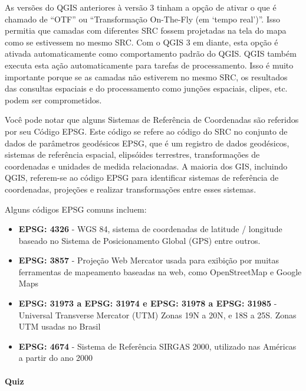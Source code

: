 \documentclass[
]{book}
\providecommand{\tightlist}{%
  \setlength{\itemsep}{0pt}\setlength{\parskip}{0pt}}
\theoremstyle{definition}
\theoremstyle{definition}
\theoremstyle{definition}
\theoremstyle{definition}
\theoremstyle{remark}
\begin{document}
As versões do QGIS anteriores à versão 3 tinham a opção de ativar o que é chamado de ``OTF'' ou ``Transformação On-The-Fly (em `tempo real')''. Isso permitia que camadas com diferentes SRC fossem projetadas na tela do mapa como se estivessem no mesmo SRC. Com o QGIS 3 em diante, esta opção é ativada automaticamente como comportamento padrão do QGIS. QGIS também executa esta ação automaticamente para tarefas de processamento. Isso é muito importante porque se as camadas não estiverem no mesmo SRC, os resultados das consultas espaciais e do processamento como junções espaciais, clipes, etc. podem ser comprometidos.

Você pode notar que alguns Sistemas de Referência de Coordenadas são referidos por seu Código EPSG. Este código se refere ao código do SRC no conjunto de dados de parâmetros geodésicos EPSG, que é um registro de dados geodésicos, sistemas de referência espacial, elipsóides terrestres, transformações de coordenadas e unidades de medida relacionadas. A maioria dos GIS, incluindo QGIS, referem-se ao código EPSG para identificar sistemas de referência de coordenadas, projeções e realizar transformações entre esses sistemas.

Alguns códigos EPSG comuns incluem:

\begin{itemize}
\tightlist
\item
  \textbf{EPSG: 4326} - WGS 84, sistema de coordenadas de latitude / longitude baseado no Sistema de Posicionamento Global (GPS) entre outros.
\item
  \textbf{EPSG: 3857} - Projeção Web Mercator usada para exibição por muitas ferramentas de mapeamento baseadas na web, como OpenStreetMap e Google Maps
\item
  \textbf{EPSG: 31973 a EPSG: 31974 e EPSG: 31978 a EPSG: 31985} - Universal Transverse Mercator (UTM) Zonas 19N a 20N, e 18S a 25S. Zonas UTM usadas no Brasil
\item
  \textbf{EPSG: 4674} - Sistema de Referência SIRGAS 2000, utilizado nas Américas a partir do ano 2000
\end{itemize}

\hypertarget{quiz}{%
\paragraph{Quiz}\label{quiz}}
\end{document}
